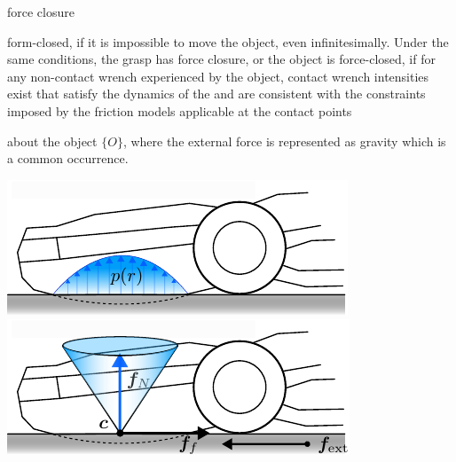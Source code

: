 force closure 

form-closed, if it is impossible to move the object, even infinitesimally. Under the same conditions, the grasp has force closure, or the object is force-closed, if for any non-contact wrench experienced by the object, contact wrench intensities exist that satisfy the dynamics of the and are consistent with the constraints imposed by the friction models applicable at the contact points~\cite{handbook-of-robotics}


about the object $\{O\}$, where the external force is represented as gravity which is a common occurrence.

\begin{center}
    \renewcommand{\arraystretch}{1.2}
    \begin{minipage}{.48\linewidth}
        \vspace{0pt}
        \centering
        \includegraphics[width=.95\textwidth]{chapters/modeling/fig/contact-surface.pdf}%
        \vspace{0.6cm}
        \includegraphics[width=.95\textwidth]{chapters/modeling/fig/friction-cone-schematic-crop.pdf}%
    \end{minipage}%
    \hfill%
    \begin{minipage}{.48\linewidth}
        \vspace{0pt}
        \centering

\end{minipage}
\end{center}
